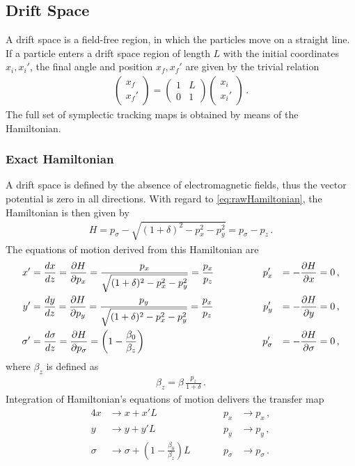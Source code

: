 \subsection{Drift Space}
A drift space is a field-free region, in which the particles move on a straight line. If a particle enters a drift space region of length $L$ with the initial coordinates $x_i,x_i'$, the final angle and position $x_f,x_f'$ are given by the trivial relation
\begin{align}
\begin{pmatrix} x_f \\ x_f' \end{pmatrix} = \begin{pmatrix} 1 & L \\ 0 & 1 \end{pmatrix} \begin{pmatrix} x_i \\ x_i' \end{pmatrix} \, .
\end{align}
The full set of symplectic tracking maps is obtained by means of the Hamiltonian. 


\subsubsection{Exact Hamiltonian}
A drift space is defined by the absence of electromagnetic fields, thus the vector potential is zero in all directions. With regard to \eqref{eq:rawHamiltonian}, the Hamiltonian is then given by
\begin{align}
H = p_\sigma - \sqrt{(1+\delta)^2 - p_x^2 -p_y^2}  = p_\sigma - p_z\, . \label{eq:full_H_drift}
\end{align}
The equations of motion derived from this Hamiltonian are
\begin{alignat}{4}
x' &= \frac{d x}{d z} = \frac{\partial H}{\partial p_x} = \frac{p_x}{ \sqrt{(1+\delta)^2 - p_x^2 -p_y^2} } = \frac{p_x}{p_z} \quad \quad \quad \quad &p_x' &&= -\frac{\partial H}{\partial x} = 0 \, , \\
y' &= \frac{d y}{d z} = \frac{\partial H}{\partial p_y} = \frac{p_y}{\sqrt{(1+\delta)^2 - p_x^2 -p_y^2}} = \frac{p_x}{p_z} \quad \quad &p_y' &&= -\frac{\partial H}{\partial y} = 0 \, , \\
\sigma' &=  \frac{d \sigma}{d z} = \frac{\partial H}{\partial p_\sigma} = \left( 1 - \frac{\beta_0}{\beta_z}  \right)     &p_\sigma' &&= -\frac{\partial H}{\partial \sigma} = 0 \, , 
\end{alignat}
where $\beta_z$ is defined as 
\begin{align}
\beta_z = \beta \, \frac{p_z}{1+\delta}\,.
\end{align}
%
Integration of Hamiltonian's equations of motion delivers the transfer map 
\begin{alignat}{4}
x & \rightarrow x + x' L \quad \quad \quad \quad \quad \quad &p_x &\rightarrow p_x \, , \\
y & \rightarrow y + y' L \quad \quad &p_y &\rightarrow p_y \, , \\
\sigma & \rightarrow \sigma + \left(1 - \frac{\beta_0}{\beta_z}\right) L \quad \quad &p_\sigma &\rightarrow p_\sigma \, .
\end{alignat}

